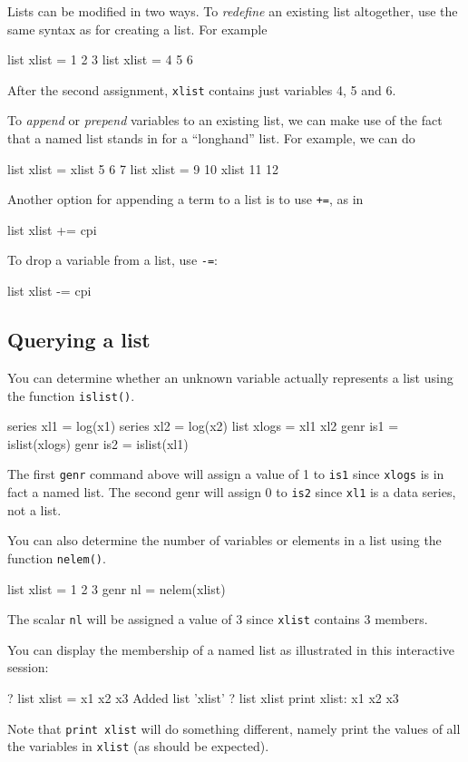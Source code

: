 Lists can be modified in two ways.  To \textit{redefine} an existing
list altogether, use the same syntax as for creating a list.  For
example
%
\begin{code}
list xlist = 1 2 3
list xlist = 4 5 6
\end{code}

After the second assignment, \texttt{xlist} contains just variables 4,
5 and 6.

To \textit{append} or \textit{prepend} variables to an existing list,
we can make use of the fact that a named list stands in for a
``longhand'' list.  For example, we can do
%
\begin{code}
list xlist = xlist 5 6 7
list xlist = 9 10 xlist 11 12
\end{code}
%
Another option for appending a term to a list is to use \texttt{+=},
as in
%
\begin{code}
list xlist += cpi
\end{code}
%
To drop a variable from a list, use \texttt{-=}:
%
\begin{code}
list xlist -= cpi
\end{code}
%

\subsection{Querying a list}

You can determine whether an unknown variable actually represents a list
using the function \texttt{islist()}.
%
\begin{code}
series xl1 = log(x1)
series xl2 = log(x2)
list xlogs = xl1 xl2
genr is1 = islist(xlogs)
genr is2 = islist(xl1)
\end{code}

The first \texttt{genr} command above will assign a value of 1 to
\texttt{is1} since \texttt{xlogs} is in fact a named list.  The second
genr will assign 0 to \texttt{is2} since \texttt{xl1} is a data
series, not a list.  

You can also determine the number of variables or elements in a list
using the function \texttt{nelem()}.
%
\begin{code}
list xlist = 1 2 3
genr nl = nelem(xlist)
\end{code}

The scalar \texttt{nl} will be assigned a value of 3 since
\texttt{xlist} contains 3 members.

You can display the membership of a named list as illustrated in this
interactive session:
%
\begin{code}
? list xlist = x1 x2 x3
Added list 'xlist'
? list xlist print
 xlist: x1 x2 x3
\end{code}
%
Note that \texttt{print xlist} will do something different, namely
print the values of all the variables in \texttt{xlist} (as should be
expected).

